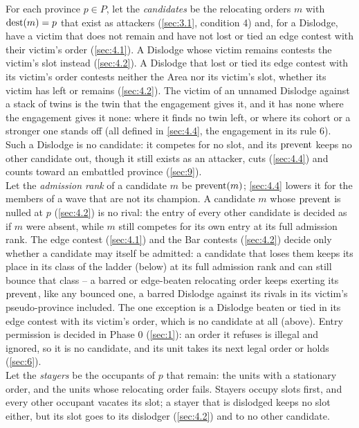 \documentclass[12pt,a4paper]{article}
\begin{document}
For each province $p \in P$, let the \emph{candidates} be the relocating orders $m$ with $\operatorname{dest}(m) = p$ that exist as attackers (\cref{sec:3.1}, condition 4) and, for a Dislodge, have a victim that does not remain and have not lost or tied an edge contest with their victim's order (\cref{sec:4.1}).
A Dislodge whose victim remains contests the victim's slot instead (\cref{sec:4.2}).
A Dislodge that lost or tied its edge contest with its victim's order contests neither the Area nor its victim's slot, whether its victim has left or remains (\cref{sec:4.2}).
The victim of an unnamed Dislodge against a stack of twins is the twin that the engagement gives it, and it has none where the engagement gives it none: where it finds no twin left, or where its cohort or a stronger one stands off (all defined in \cref{sec:4.4}, the engagement in its rule 6).
Such a Dislodge is no candidate: it competes for no slot, and its $\operatorname{prevent}$ keeps no other candidate out, though it still exists as an attacker, cuts (\cref{sec:4.4}) and counts toward an embattled province (\cref{sec:9}).\\
Let the \emph{admission rank} of a candidate $m$ be $\operatorname{prevent}(m)$; \cref{sec:4.4} lowers it for the members of a wave that are not its champion.
A candidate $m$ whose $\operatorname{prevent}$ is nulled at $p$ (\cref{sec:4.2}) is no rival: the entry of every other candidate is decided as if $m$ were absent, while $m$ still competes for its own entry at its full admission rank.
The edge contest (\cref{sec:4.1}) and the Bar contests (\cref{sec:4.2}) decide only whether a candidate may itself be admitted: a candidate that loses them keeps its place in its class of the ladder (below) at its full admission rank and can still bounce that class -- a barred or edge-beaten relocating order keeps exerting its $\operatorname{prevent}$, like any bounced one, a barred Dislodge against its rivals in its victim's pseudo-province included.
The one exception is a Dislodge beaten or tied in its edge contest with its victim's order, which is no candidate at all (above).
Entry permission is decided in Phase 0 (\cref{sec:1}): an order it refuses is illegal and ignored, so it is no candidate, and its unit takes its next legal order or holds (\cref{sec:6}).\\
Let the \emph{stayers} be the occupants of $p$ that remain: the units with a stationary order, and the units whose relocating order fails.
Stayers occupy slots first, and every other occupant vacates its slot; a stayer that is dislodged keeps no slot either, but its slot goes to its dislodger (\cref{sec:4.2}) and to no other candidate.
\end{document}
